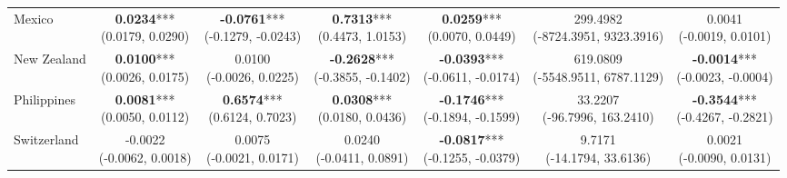 \documentclass[a4paper,10pt,final]{article}    %
\begin{document}
\begin{table}[htbp]
{\begin{tabular}{l|cccccc}
            Mexico         & \makecell{\textbf{0.0234}***                                                                   \\ \scriptsize{(0.0179, 0.0290)}} & \makecell{\textbf{-0.0761}*** \\ \scriptsize{(-0.1279, -0.0243)}} & \makecell{\textbf{0.7313}*** \\ \scriptsize{(0.4473, 1.0153)}} & \makecell{\textbf{0.0259}*** \\ \scriptsize{(0.0070, 0.0449)}} & \makecell{299.4982 \\ \scriptsize{(-8724.3951, 9323.3916)}} & \makecell{0.0041 \\ \scriptsize{(-0.0019, 0.0101)}} \\
            New Zealand    & \makecell{\textbf{0.0100}***                                                                   \\ \scriptsize{(0.0026, 0.0175)}} & \makecell{0.0100 \\ \scriptsize{(-0.0026, 0.0225)}} & \makecell{\textbf{-0.2628}*** \\ \scriptsize{(-0.3855, -0.1402)}} & \makecell{\textbf{-0.0393}*** \\ \scriptsize{(-0.0611, -0.0174)}} & \makecell{619.0809 \\ \scriptsize{(-5548.9511, 6787.1129)}} & \makecell{\textbf{-0.0014}*** \\ \scriptsize{(-0.0023, -0.0004)}} \\
            Philippines    & \makecell{\textbf{0.0081}***                                                                   \\ \scriptsize{(0.0050, 0.0112)}} & \makecell{\textbf{0.6574}*** \\ \scriptsize{(0.6124, 0.7023)}} & \makecell{\textbf{0.0308}*** \\ \scriptsize{(0.0180, 0.0436)}} & \makecell{\textbf{-0.1746}*** \\ \scriptsize{(-0.1894, -0.1599)}} & \makecell{33.2207 \\ \scriptsize{(-96.7996, 163.2410)}} & \makecell{\textbf{-0.3544}*** \\ \scriptsize{(-0.4267, -0.2821)}} \\
            Switzerland    & \makecell{-0.0022                                                                              \\ \scriptsize{(-0.0062, 0.0018)}} & \makecell{0.0075 \\ \scriptsize{(-0.0021, 0.0171)}} & \makecell{0.0240 \\ \scriptsize{(-0.0411, 0.0891)}} & \makecell{\textbf{-0.0817}*** \\ \scriptsize{(-0.1255, -0.0379)}} & \makecell{9.7171 \\ \scriptsize{(-14.1794, 33.6136)}} & \makecell{0.0021 \\ \scriptsize{(-0.0090, 0.0131)}} \\

\end{tabular}}
\end{table}
\end{document}
